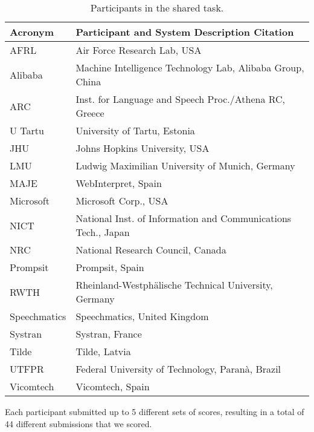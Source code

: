 \documentclass[11pt,a4paper]{article}
\begin{document}
\begin{table*}
\begin{tabular}{|l|l|} \hline
\bf Acronym & \bf Participant and System Description Citation \\ \hline
AFRL     &  Air Force Research Lab, USA \citep{erdmann-gwinnup:2018:WMT} \\
Alibaba  &  Machine Intelligence Technology Lab, Alibaba Group, China \citep{lu-EtAl:2018:WMT1} \\
ARC & Inst. for Language and Speech Proc./Athena RC, Greece \citep{papavassiliou-EtAl:2018:WMT} \\
U Tartu & University of Tartu, Estonia \citep{barbu-barbumititelu:2018:WMT} \\
JHU & Johns Hopkins University, USA \citep{khayrallah-xu-koehn:2018:WMT} \\
LMU & Ludwig Maximilian University of Munich, Germany \citep{hangya-fraser:2018:WMT} \\ 
MAJE & WebInterpret, Spain \citep{fomicheva-gonzlezrubio:2018:WMT} \\
Microsoft & Microsoft Corp., USA \citep{junczysdowmunt:2018:WMT1} \\
NICT & National Inst. of Information and Communications Tech., Japan \citep{wang-EtAl:2018:WMT1} \\
NRC & National Research Council, Canada \citep{littell-EtAl:2018:WMT,lo-EtAl:2018:WMT} \\
Prompsit & Prompsit, Spain \citep{snchezcartagena-EtAl:2018:WMT} \\
RWTH & Rheinland-Westph\"alische Technical University, Germany \citep{rossenbach-EtAl:2018:WMT} \\
Speechmatics & Speechmatics, United Kingdom \citep{ash-francis-williams:2018:WMT} \\
Systran & Systran, France \citep{pham-crego-senellart:2018:WMT} \\
Tilde & Tilde, Latvia \citep{pinnis:2018:WMT} \\ 
UTFPR & Federal University of Technology, Paran\`a, Brazil \citep{paetzold:2018:WMT} \\
Vicomtech & Vicomtech, Spain \citep{azpeitia-etchegoyhen-martnezgarcia:2018:WMT} \\ \hline
\end{tabular} 
\caption{Participants in the shared task.}
\label{tab:participants}
\end{table*}

Each participant submitted up to 5 different sets of scores, resulting in a total of 44 different submissions that we scored.
\end{document}
